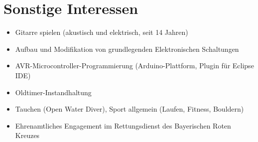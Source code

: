 

\section*{Sonstige Interessen}

\begin{itemize}
	\item Gitarre spielen (akustisch und elektrisch, seit 14 Jahren)
	\item Aufbau und Modifikation von grundlegenden Elektronischen Schaltungen
	\item AVR-Microcontroller-Programmierung (Arduino-Plattform, Plugin für Eclipse IDE)
	\item Oldtimer-Instandhaltung 
	\item Tauchen (Open Water Diver), Sport allgemein (Laufen, Fitness, Bouldern)
	\item Ehrenamtliches Engagement im Rettungsdienst des Bayerischen Roten Kreuzes
\end{itemize}